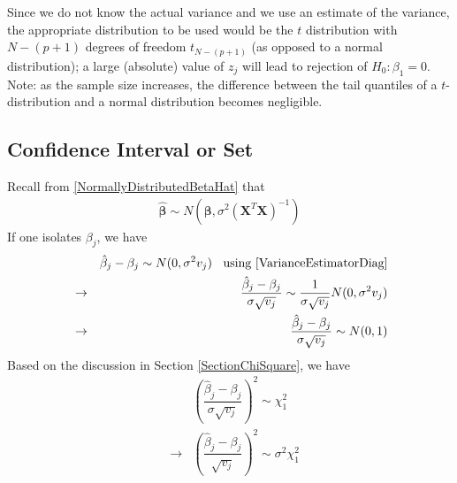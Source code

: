 \documentclass[11pt]{article}
\theoremstyle{remark}
\begin{document}
Since we do not know the actual variance and we use an estimate of the variance, the appropriate distribution to be used would be the $t$ distribution with $N-(p+1)$ degrees of freedom $t_{N-(p+1)}$ (as opposed to a normal distribution); a large (absolute) value of $z_j$ will lead to rejection of $H_0: \beta_1 = 0$. Note: as the sample size increases, the difference between the tail quantiles of a $t$-distribution and a normal distribution becomes negligible.


\subsection{Confidence Interval or Set}
Recall from \eqref{NormallyDistributedBetaHat} that
\begin{eqnarray}
\boldsymbol{\hat{\beta}}\sim N(\boldsymbol{\beta},\sigma^2 \left(\mathbf{X}^T\mathbf{X}\right)^{-1})
\end{eqnarray}
If one isolates $\beta_j$, we have
\begin{eqnarray}
&&\hat{\beta}_j - \beta_j \sim N(0,\sigma^2 v_j )\:\:\:\:\text{using \eqref{VarianceEstimatorDiag}}\nonumber\\
&\rightarrow&\dfrac{\hat{\beta}_j - \beta_j}{\sigma \sqrt{v_j}} \sim \dfrac{1}{\sigma \sqrt{v_j}}N(0,\sigma^2 v_j )\nonumber\\
&\rightarrow&\dfrac{\hat{\beta}_j - \beta_j}{\sigma \sqrt{v_j}} \sim N(0,1)
\end{eqnarray}
Based on the discussion in Section \ref{SectionChiSquare}, we have
\begin{eqnarray}
&&\left(\dfrac{\hat{\beta}_j - \beta_j}{\sigma \sqrt{v_j}}\right)^2 \sim \chi_1^2\nonumber\\
&\rightarrow&\left(\dfrac{\hat{\beta}_j - \beta_j}{\sqrt{v_j}}\right)^2 \sim \sigma^2\chi_1^2
\end{eqnarray}


\end{document}
